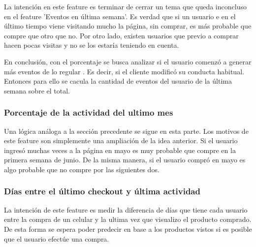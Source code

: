 \documentclass[a4paper]{article}
\begin{document}
\begin{sloppypar}
	\texttt{}
\end{sloppypar}

La intención en este feature es terminar de cerrar un tema que queda inconcluso en el feature ’Eventos en última semana’. Es verdad que si un usuario e en el último tiempo viene visitando mucho la página, sin comprar, es más probable que compre que otro que no. Por otro lado, existen usuarios que previo
a comprar hacen pocas visitas y no se los estaría teniendo en cuenta.

En conclusión, con el porcentaje se busca analizar si el usuario comenzó a generar más eventos de lo regular . Es decir, si el cliente modificó su conducta habitual. Entonces para ello se cacula la cantidad de eventos del usuario de la última semana sobre el total.

\subsubsection{Porcentaje de la actividad del ultimo mes}

\begin{sloppypar}
	\texttt{}
\end{sloppypar}

Una lógica análoga a la sección precedente se sigue en esta parte. Los motivos de este feature son simplemente una ampliación de la idea anterior. Si el usuario ingresó muchas veces a la página en mayo es muy probable que compre en la primera semana de junio. De la misma manera, si el usuario compró en mayo es algo probable que no compre por las siguientes dos.

\subsubsection{Días entre el último checkout y última actividad}

\begin{sloppypar}
	\texttt{}
\end{sloppypar}

La intención de este feature es medir la diferencia de días que tiene cada usuario entre la compra de un celular y la ultima vez que visualizo el producto comprado. De esta forma se espera poder predecir en base a los productos vistos si es posible que el usuario efectúe una compra.
\end{document}
